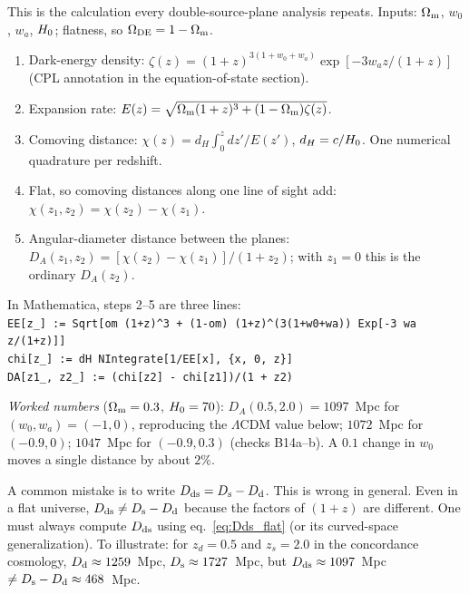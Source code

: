 \begin{derivation}
This is the calculation every double-source-plane analysis repeats.  Inputs:
$\Omega_{\mathrm{m}}$, $w_0$, $w_a$, $H_0$; flatness, so $\Omega_{\rm DE} = 1-\Omega_{\mathrm{m}}$.
\begin{enumerate}
  \item Dark-energy density: $\zeta(z) = (1+z)^{3(1+w_0+w_a)}\exp[-3w_az/(1+z)]$
        (CPL annotation in the equation-of-state section).
  \item Expansion rate: $E(z) = \sqrt{\Omega_{\mathrm{m}}(1+z)^3 + (1-\Omega_{\mathrm{m}})\zeta(z)}$.
  \item Comoving distance: $\chi(z) = d_H\int_0^z dz'/E(z')$,
        $d_H = c/H_0$.  One numerical quadrature per redshift.
  \item Flat, so comoving distances along one line of sight add:
        $\chi(z_1,z_2) = \chi(z_2) - \chi(z_1)$.
  \item Angular-diameter distance between the planes:
        $D_A(z_1,z_2) = [\chi(z_2) - \chi(z_1)]/(1+z_2)$; with $z_1 = 0$ this is
        the ordinary $D_A(z_2)$.
\end{enumerate}
In Mathematica, steps 2--5 are three lines:\\
\texttt{EE[z\_] := Sqrt[om (1+z)\^{}3 + (1-om) (1+z)\^{}(3(1+w0+wa)) Exp[-3 wa z/(1+z)]]}\\
\texttt{chi[z\_] := dH NIntegrate[1/EE[x], \{x, 0, z\}]}\\
\texttt{DA[z1\_, z2\_] := (chi[z2] - chi[z1])/(1 + z2)}

\smallskip
\textit{Worked numbers} ($\Omega_{\mathrm{m}} = 0.3$, $H_0 = 70$):
$D_A(0.5, 2.0) = 1097$~Mpc for $(w_0,w_a) = (-1,0)$, reproducing the
$\Lambda$CDM value below; $1072$~Mpc for $(-0.9, 0)$; $1047$~Mpc for
$(-0.9, 0.3)$ (checks B14a--b).  A $0.1$ change in $w_0$ moves a single
distance by about $2\%$.
\end{derivation}
\begin{remark}
A common mistake is to write $D_{\mathrm{ds}} = D_{\mathrm{s}} - D_{\mathrm{d}}$.  This is wrong
in general.  Even in a flat universe, $D_{\mathrm{ds}} \neq D_{\mathrm{s}} - D_{\mathrm{d}}$ because the
factors of $(1+z)$ are different.  One must always compute $D_{\mathrm{ds}}$ using
eq.~\eqref{eq:Dds_flat} (or its curved-space generalization).  To
illustrate: for $z_d = 0.5$ and $z_s = 2.0$ in the concordance
cosmology, $D_{\mathrm{d}} \approx 1259$~Mpc, $D_{\mathrm{s}} \approx 1727$~Mpc, but
$D_{\mathrm{ds}} \approx 1097$~Mpc $\neq D_{\mathrm{s}} - D_{\mathrm{d}} \approx 468$~Mpc.
\end{remark}


